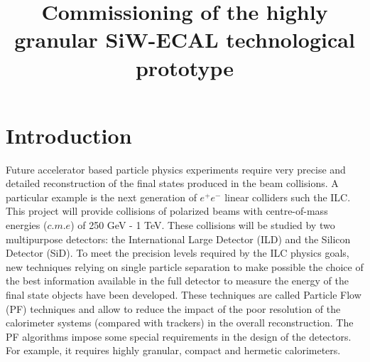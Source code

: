 \documentclass[a4paper,11pt]{article}
\title{\boldmath Commissioning of the highly granular SiW-ECAL technological prototype}
\begin{document}
\maketitle
\flushbottom


\section{Introduction}

Future accelerator based particle physics experiments
require very precise and detailed reconstruction of the final states produced
in the beam collisions. A particular example is the next generation of $e^{+}e^{-}$
linear colliders such the ILC\cite{Behnke:2013xla,Baer:2013cma,Adolphsen:2013jya,Adolphsen:2013kya,Behnke:2013lya}.
This project will provide collisions of polarized beams with centre-of-mass energies ($c.m.e$) of 250 GeV - 1 TeV.
These collisions will be studied by two multipurpose detectors:
the International Large Detector (ILD) and the Silicon Detector (SiD)\cite{Behnke:2013lya}.
To meet the precision levels required by the ILC %
physics goals,
new techniques relying on single particle separation to make possible the choice of the best information available
in the full detector to measure the energy of the final state objects have been developed.
These techniques are called Particle Flow (PF) techniques \cite{Brient:2002gh,Morgunov:2004ed,Sefkow:2015hna}
and allow to reduce the impact of the poor resolution of the calorimeter systems (compared with trackers) in the overall reconstruction.
The PF algorithms impose some special requirements in the design of the detectors.
For example, it requires highly granular, compact
and hermetic calorimeters.
\end{document}

